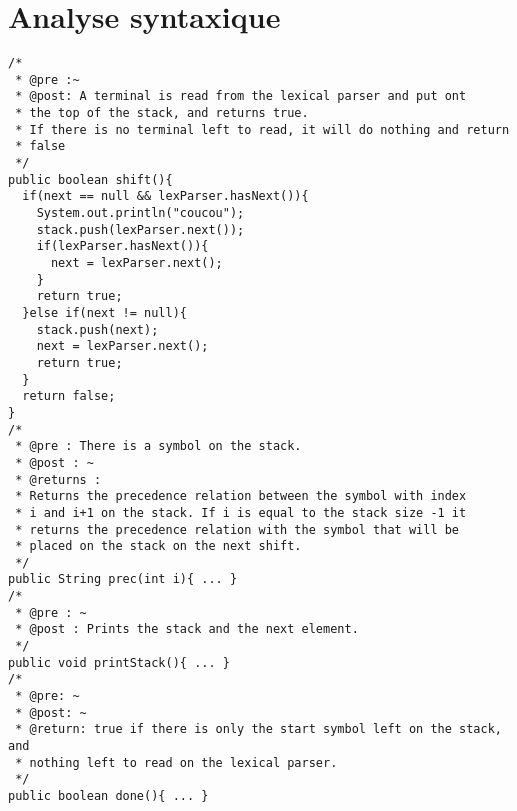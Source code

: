 \section{Analyse syntaxique}
	


  {\tiny  \begin{verbatim}
/*
 * @pre :~
 * @post: A terminal is read from the lexical parser and put ont
 * the top of the stack, and returns true.
 * If there is no terminal left to read, it will do nothing and return 
 * false
 */
public boolean shift(){
  if(next == null && lexParser.hasNext()){
    System.out.println("coucou");
    stack.push(lexParser.next());
    if(lexParser.hasNext()){
      next = lexParser.next();
    }
    return true;
  }else if(next != null){
    stack.push(next);
    next = lexParser.next();
    return true;
  }
  return false;
}
/*
 * @pre : There is a symbol on the stack.
 * @post : ~
 * @returns : 
 * Returns the precedence relation between the symbol with index
 * i and i+1 on the stack. If i is equal to the stack size -1 it
 * returns the precedence relation with the symbol that will be
 * placed on the stack on the next shift.
 */
public String prec(int i){ ... }
/*
 * @pre : ~
 * @post : Prints the stack and the next element. 
 */
public void printStack(){ ... }
/* 
 * @pre: ~
 * @post: ~
 * @return: true if there is only the start symbol left on the stack, and 
 * nothing left to read on the lexical parser.
 */
public boolean done(){ ... }


\end{verbatim}}
